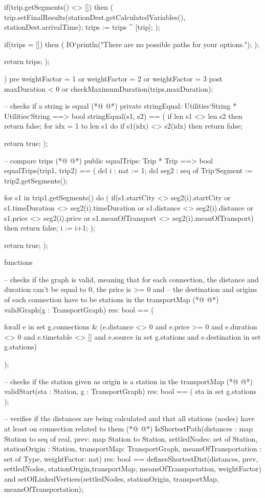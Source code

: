 \begin{vdmpp}[breaklines=true]
   if(trip.getSegments() <> []) then (
      trip.setFinalResults(stationDest.getCalculatedVariables(), stationDest.arrivalTime);
     trips := trips ^ [trip];
   );
   
   if(trips = []) then (
     IO`println("There are no possible paths for your options."); 
   );
   
   return trips;
  );
  
 )
 pre weightFactor = 1 or weightFactor = 2 or weightFactor = 3
 post maxDuration < 0 or checkMaximumDuration(trips,maxDuration);
 
 -- checks if a string is equal
(*@
\label{stringEqual:474}
@*)
 private stringEqual: Utilities`String * Utilities`String ==> bool
 stringEqual(s1, s2) ==
 (
  if len s1 <> len s2 then
   return false;
  for idx = 1 to len s1 do
   if s1(idx) <> s2(idx) then return false;
  
  return true;
 );
 
 -- compare trips
(*@
\label{equalTrips:486}
@*)
 public equalTrips: Trip * Trip ==> bool
 equalTrips(trip1, trip2) == (
   dcl i : nat := 1;
   dcl seg2 : seq of Trip`Segment := trip2.getSegments();
   
   for s1 in trip1.getSegments() do (
     if(s1.startCity <> seg2(i).startCity or s1.timeDuration <> seg2(i).timeDuration or s1.distance <> seg2(i).distance or s1.price <> seg2(i).price or s1.meanOfTransport <> seg2(i).meanOfTransport) then
       return false;
     i := i+1;
   );
   
   return true;
 );
 
 
functions
 
 -- checks if the graph is valid, meaning that for each connection, the distance and duration can't be equal to 0, the price is >= 0 and
 -- the destination and origins of each connection have to be stations in the transportMap
(*@
\label{validGraph:505}
@*)
 validGraph(g : TransportGraph) res: bool ==
 (
  
  forall e in set g.connections & (e.distance <> 0 and e.price >= 0 and e.duration <> 0 and e.timetable <> [] 
  and e.source in set g.stations and e.destination in set g.stations)
  
 );
 
 -- checks if the station given as origin is a station in the transportMap
(*@
\label{validStart:514}
@*)
 validStart(sta : Station, g : TransportGraph) res: bool ==
 (
  sta in set g.stations
 );
 
 -- verifies if the distances are being calculated and that all stations (nodes) have at least on connection related to them
(*@
\label{IsShortestPath:520}
@*)
 IsShortestPath(distances : map Station to seq of real, prev: map Station to Station, settledNodes: set of Station, stationOrigin : Station, transportMap: TransportGraph, meansOfTransportation : set of Type, weightFactor: nat) res: bool ==
  definesShortestDist(distances, prev, settledNodes, stationOrigin,transportMap, meansOfTransportation, weightFactor) 
  and setOfLinkedVertices(settledNodes, stationOrigin, transportMap, meansOfTransportation);
 

\end{vdmpp}
